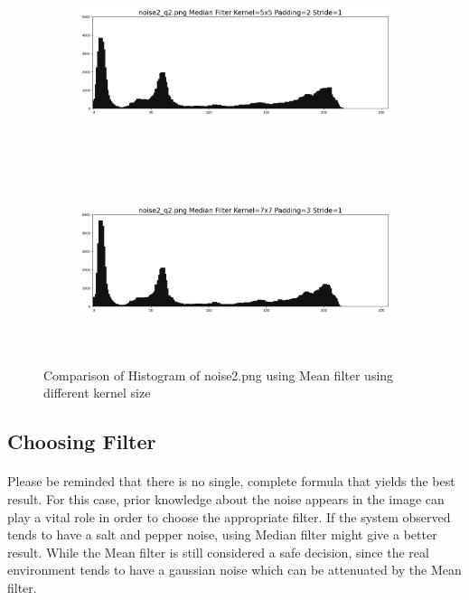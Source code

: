 \documentclass[12pt,a4paper]{report}
\begin{document}
\begin{figure}[!htb]
\begin{minipage}{\linewidth}
    \begin{subfigure}{1\textwidth}
      \includegraphics[height=5.3cm]{output/noise2_q2_K5P2_his.png}
    \end{subfigure}
    \begin{subfigure}{1\textwidth}
      \includegraphics[height=5.3cm]{output/noise2_q2_K7P3_his.png}
    \end{subfigure}
    
  \caption{Comparison of Histogram of noise2.png using Mean filter using different kernel size}
\label{fig:n2-median-hist}
\end{minipage}
\end{figure}
\clearpage
\subsection{Choosing Filter}
\paragraph*{}Please be reminded that there is no single, complete formula that yields the best
result. For this case, prior knowledge about the noise appears in the image can play a vital role in order to choose the appropriate filter. If the system observed tends to have a salt and pepper noise, using Median filter might give a better result. While the Mean filter is still considered a safe decision, since the real environment tends to have a gaussian noise which can be attenuated by the Mean filter.
\end{document}
